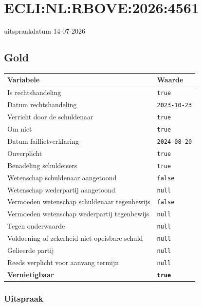\documentclass[
  dutch,
  a4paper,
]{article}
\begin{document}

\section{ECLI:NL:RBOVE:2026:4561}\label{eclinlrbove20264561}

uitspraakdatum 14-07-2026

\subsection{Gold}\label{gold-3}

\begin{center}
\small
\begin{tabular}{@{}p{8cm}p{2.6cm}@{}}
\toprule
Variabele & Waarde \\
\midrule
Is rechtshandeling & \texttt{true} \\
Datum rechtshandeling & \texttt{2023-10-23} \\
Verricht door de schuldenaar & \texttt{true} \\
Om niet & \texttt{true} \\
Datum faillietverklaring & \texttt{2024-08-20} \\
Onverplicht & \texttt{true} \\
Benadeling schuldeisers & \texttt{true} \\
Wetenschap schuldenaar aangetoond & \texttt{false} \\
Wetenschap wederpartij aangetoond & \texttt{null} \\
Vermoeden wetenschap schuldenaar tegenbewijs & \texttt{false} \\
Vermoeden wetenschap wederpartij tegenbewijs & \texttt{null} \\
Tegen onderwaarde & \texttt{null} \\
Voldoening of zekerheid niet opeisbare schuld & \texttt{null} \\
Gelieerde partij & \texttt{null} \\
Reeds verplicht voor aanvang termijn & \texttt{null} \\
\textbf{Vernietigbaar} & \textbf{\texttt{true}} \\
\bottomrule
\end{tabular}
\end{center}

\subsubsection{Uitspraak}\label{uitspraak-3}
\end{document}
